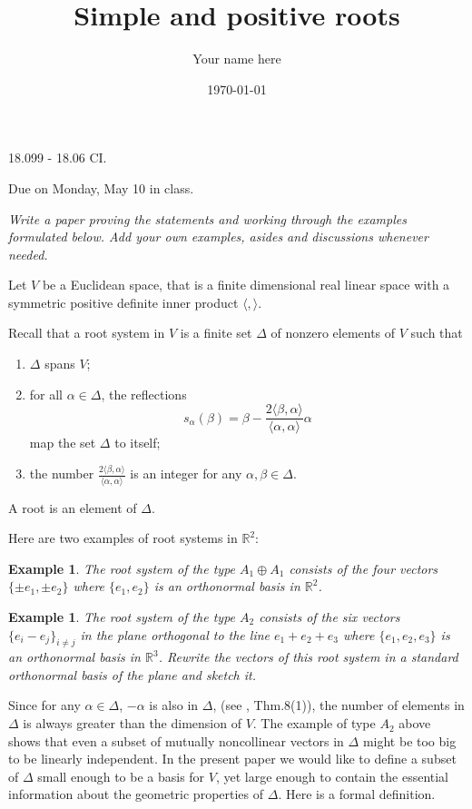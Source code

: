 \documentclass[11pt]{amsart}
\newcommand{\R}{\mathbb R}
\newcommand{\la}{\langle}
\newcommand{\ra}{\rangle}
\newtheorem{example}[theorem]{Example}
\begin{document}
\title{Simple and positive roots}
\author{Your name here}
\date{\today}
\maketitle


{\Large  18.099 - 18.06 CI.} 

{Due on Monday, May 10 in class.} 

\vspace{1cm} 

{\it Write a paper proving the statements and working through the 
examples formulated below. Add your own 
examples, asides and discussions whenever needed. }



Let $V$ be a Euclidean space, that is  
a finite dimensional real linear space with a symmetric 
positive definite inner product $\la, \ra$. 

Recall that a root system in  
$V$ is a finite set $\Delta$ of nonzero 
elements of $V$ such that 
\begin{enumerate} 
\item{$\Delta$ spans $V$;}
\item{for all $\alpha \in \Delta$, the reflections  
$$ s_\alpha (\beta) = 
\beta -\frac{2 \la \beta, \alpha \ra }{\la \alpha, \alpha \ra}\alpha $$ 
map the set $\Delta$ to itself;}
\item{the number $\frac{2 \la \beta, \alpha \ra }{\la \alpha, \alpha \ra}$ 
is an integer for any $\alpha, \beta \in \Delta$.}
\end{enumerate} 
A root is an element of $\Delta$. 

Here are two examples of root systems in $\R^2$: 
\begin{example} \label{A1}
The root system of the type $A_1 \oplus A_1$ consists of 
the four vectors $\{ \pm e_1, \pm e_2 \}$ where $\{e_1,e_2 \}$ is an 
orthonormal basis in $\R^2$.
\end{example} 
\begin{example} \label{A2}
The root system of the type $A_2$ consists of the six vectors 
$\{e_i -e_j \}_{i\neq j}$ in the plane orthogonal to the line $e_1 +e_2 +e_3$ 
where $\{e_1, e_2, e_3\}$ is an orthonormal basis in $\R^3$.
Rewrite the vectors of this root system in a standard orthonormal basis of 
the plane and sketch it. 
\end{example}   


Since for any $\alpha \in \Delta$, $-\alpha$ is also in  $\Delta$, 
(see \cite{1}, Thm.8(1)),  
the number of elements in $\Delta$ is always 
greater than the dimension of $V$. The  
example of type $A_2$ above shows that even a subset of mutually 
noncollinear vectors in $\Delta$ might be too big to be linearly independent.  
In the present paper we would like  
to define a subset of $\Delta$ small enough to be a basis for $V$, yet 
large enough to contain the essential 
information about the geometric properties of $\Delta$. Here is a formal 
definition. 
\end{document}
